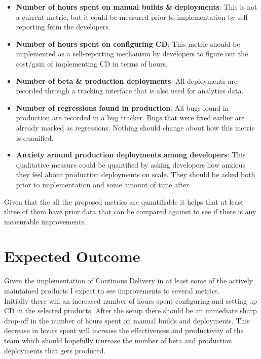 \documentclass{ituthesis}
\begin{document}
\begin{itemize}
	\item \textbf{Number of hours spent on manual builds \& deployments}: This is not a current metric, but it could be measured prior to implementation by self reporting from the developers.
	\item \textbf{Number of hours spent on configuring CD}: This metric should be implemented as a self-reporting mechanism by developers to figure out the cost/gain of implementing CD in terms of hours.
	\item \textbf{Number of beta \& production deployments}: All deployments are recorded through a tracking interface that is also used for analytics data.
	\item \textbf{Number of regressions found in production}: All bugs found in production are recorded in a bug tracker. Bugs that were fixed earlier are already marked as regressions. Nothing should change about how this metric is quanified.
	\item \textbf{Anxiety around production deployments among developers}: This qualitative measure could be quantified by asking developers how anxious they feel about production deployments on scale. They should be asked both prior to implementation and some amount of time after.
\end{itemize}

Given that the all the proposed metrics are qunatifiable it helps that at least three of them have prior data that can be compared against to see if there is any measurable improvements.

\section{Expected Outcome}

Given the implementation of Continous Delivery in at least some of the actively maintained products I expect to see improvements to several metrics.\\

Initially there will an increased number of hours spent configuring and setting up CD in the selected products. After the setup there should be an immediate sharp drop-off in the number of hours spent on manual builds and deployments. This decrease in hours spent will increase the effectiveness and productivity of the team which should hopefully icnrease the number of beta and production deployments that gets produced.\\
\end{document}
